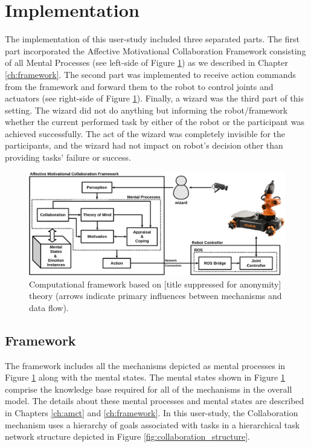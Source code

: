 \documentclass[12pt]{report}
\begin{document}
\section{Implementation}
The implementation of this user-study included three separated parts. The first
part incorporated the Affective Motivational Collaboration Framework consisting
of all Mental Processes (see left-side of Figure \ref{fig:framework}) as we
described in Chapter \ref{ch:framework}. The second part was implemented to
receive action commands from the framework and forward them to the robot to
control joints and actuators (see right-side of Figure \ref{fig:framework}).
Finally, a wizard was the third part of this setting. The wizard did not do
anything but informing the robot/framework whether the current performed task by
either of the robot or the participant was achieved successfully. The act of the
wizard was completely invisible for the participants, and the wizard had not
impact on robot's decision other than providing tasks' failure or success.

\begin{figure}[tbh]
  \centering
  \includegraphics[width=\textwidth]{figure/framework-croped.pdf}
  \caption{{\fontsize{9}{9}\selectfont Computational framework based on
  [title suppressed for anonymity] theory (arrows indicate primary influences
  between mechanisms and data flow).}}
  \label{fig:framework}
  \vspace*{-5mm}
\end{figure}

\subsection{Framework}
\label{sec:theory}
The framework includes all the mechanisms depicted as mental processes in Figure
\ref{fig:framework} along with the mental states. The mental
states shown in Figure \ref{fig:framework} comprise the knowledge base required
for all of the mechanisms in the overall model. The details about these mental
processes and mental states are described in Chapters \ref{ch:amct} and
\ref{ch:framework}. In this user-study, the Collaboration mechanism uses a
hierarchy of goals associated with tasks in a hierarchical task network
structure depicted in Figure \ref{fig:collaboration_structure}.
\end{document}
